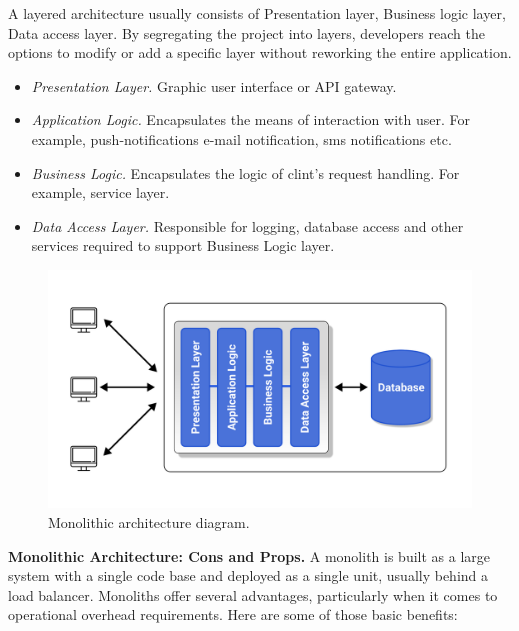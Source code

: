 A layered architecture usually consists of Presentation layer, Business logic layer, Data access layer.
By segregating the project into layers, developers reach the options to modify or add a specific layer
without reworking the entire application.

\begin{itemize}
    \item \textit{Presentation Layer.} Graphic user interface or API gateway.
    \item \textit{Application Logic.} Encapsulates the means of interaction with user.
    For example, push-notifications e-mail notification, sms notifications etc.
    \item \textit{Business Logic.} Encapsulates the logic of clint's request handling.
    For example, service layer.
    \item \textit{Data Access Layer.} Responsible for logging, database access and other services required to support
    Business Logic layer.
\end{itemize}

\begin{figure}[H]
    \centering
    \includegraphics[width=1\textwidth]{Pictures/Monolith_architecture.pdf}
    \caption{Monolithic architecture diagram.}\label{fig:figure2}
\end{figure}

\textbf{Monolithic Architecture: Cons and Props.} A monolith is built as a large system with a single code base and
deployed as a single unit, usually behind a load balancer.
Monoliths offer several advantages, particularly when it comes to operational overhead requirements.
Here are some of those basic benefits:

